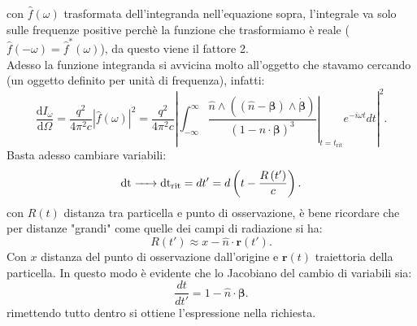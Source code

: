 con $\hat{f}\left( \omega \right) $ trasformata dell'integranda nell'equazione sopra, l'integrale va solo sulle frequenze positive perchè la funzione che trasformiamo è reale ($\hat{f}\left( -\omega \right) = \hat{f}^*\left( \omega \right) $), da questo viene il fattore 2.\\
Adesso la funzione integranda si avvicina molto all'oggetto che stavamo cercando (un oggetto definito per unità di frequenza), infatti:
\[
	\frac{\mbox{d} I_{\omega}}{\mbox{d} \Omega} = \frac{q^2}{4\pi^2 c} \left| \hat{f}\left( \omega \right)  \right|^2 =  \frac{q^2}{4\pi^2 c} 
	\left| \int_{-\infty}^{\infty} \left. \frac{ \hat{n} \wedge \left( \left( \hat{n}-\boldsymbol{\beta} \right)\wedge\dot{\boldsymbol{\beta}}\right)}
		{\left( 1- \hat{n}\cdot \boldsymbol{\beta} \right)^3 } \right|_{t = t_{\text{rit}}} e^{-i\omega t} dt \right|^2 
.\]
Basta adesso cambiare variabili: 
\[
	\ce{\ce{dt} -> \ce{dt_{\text{rit}}}} = dt' = d \left(t - \frac{R\left( t' \right) }{c} \right)
.\] 
con $R\left( t \right)$ distanza tra particella e punto di osservazione, è bene ricordare che per distanze "grandi" come quelle dei campi di radiazione si ha:
\[
	R\left( t' \right) \approx x - \hat{n}\cdot \boldsymbol{r}\left( t' \right)  
.\] 
Con $x$ distanza del punto di osservazione dall'origine e $\boldsymbol{r}\left( t \right)$ traiettoria della particella. In questo modo è evidente che lo Jacobiano del cambio di variabili sia:
\[
	\frac{dt}{dt'}= 1-\hat{n} \cdot \boldsymbol{\beta}
.\] 
rimettendo tutto dentro si ottiene l'espressione nella richiesta.


